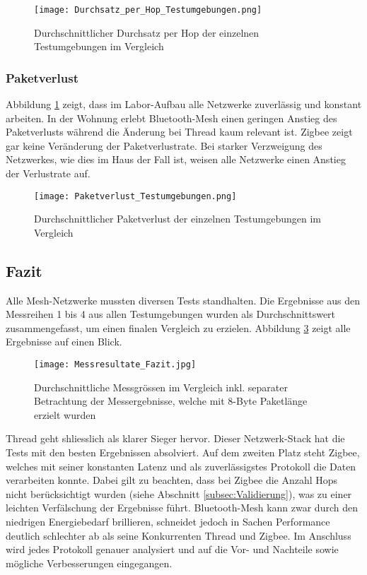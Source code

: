 \begin{figure}[H]
	\centering
	\texttt{[image: Durchsatz\_per\_Hop\_Testumgebungen.png]}
	\caption{Durchschnittlicher Durchsatz per Hop der einzelnen Testumgebungen im Vergleich}\label{fig:Durchsätze_per_Hop_Testumgebungen}
\end{figure}

\subsubsection{Paketverlust}\label{subsec:VergleichPaketverlustTestumgebungen}
Abbildung \ref{fig:Durchsätze_per_Hop_Testumgebungen} zeigt, dass im Labor-Aufbau alle Netzwerke zuverlässig und konstant arbeiten.
In der Wohnung erlebt Bluetooth-Mesh einen geringen Anstieg des Paketverlusts während die Änderung bei Thread kaum relevant ist.
Zigbee zeigt gar keine Veränderung der Paketverlustrate.
Bei starker Verzweigung des Netzwerkes, wie dies im Haus der Fall ist, weisen alle Netzwerke einen Anstieg der Verlustrate auf.


\begin{figure}[H]
	\centering
	\texttt{[image: Paketverlust\_Testumgebungen.png]}
	\caption{Durchschnittlicher Paketverlust der einzelnen Testumgebungen im Vergleich}\label{fig:PaketverlusteTestumgebungen}
\end{figure}


\subsection{Fazit}\label{subsec:FazitVergleich}
Alle Mesh-Netzwerke mussten diversen Tests standhalten. Die Ergebnisse aus den Messreihen 1 bis 4 aus allen Testumgebungen wurden als Durchschnittswert zusammengefasst, um einen finalen Vergleich zu erzielen. Abbildung \ref{fig:Messresultate_Fazit} zeigt alle Ergebnisse auf einen Blick.

\begin{figure}[H]
	\centering
	\texttt{[image: Messresultate\_Fazit.jpg]}
	\caption{Durchschnittliche Messgrössen im Vergleich inkl. separater Betrachtung der Messergebnisse, welche mit 8-Byte Paketlänge erzielt wurden}\label{fig:Messresultate_Fazit}
\end{figure}

Thread geht shliesslich als klarer Sieger hervor.
Dieser Netzwerk-Stack hat die Tests mit den besten Ergebnissen absolviert.
Auf dem zweiten Platz steht Zigbee, welches mit seiner konstanten Latenz und als zuverlässigstes Protokoll die Daten verarbeiten konnte.
Dabei gilt zu beachten, dass bei Zigbee die Anzahl Hops nicht berücksichtigt wurden (siehe Abschnitt \ref{subsec:Validierung}), was zu einer leichten Verfälschung der Ergebnisse führt.
Bluetooth-Mesh kann zwar durch den niedrigen Energiebedarf brillieren, schneidet jedoch in Sachen Performance deutlich schlechter ab als seine Konkurrenten Thread und Zigbee.
Im Anschluss wird jedes Protokoll genauer analysiert und auf die Vor- und Nachteile sowie mögliche Verbesserungen eingegangen. 


